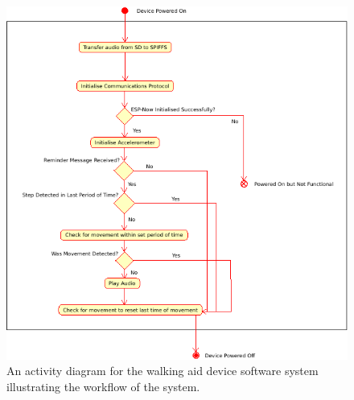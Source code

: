 \begin{figure}[H]
	\centering
	\captionsetup{width=1.0\linewidth}


	\includegraphics[width=1.0\linewidth]{./UML/WalkingAidDevice/activity diagram.png}

	\caption[Walking Aid Device Activity Diagram]{An activity diagram for the walking aid device software system illustrating the workflow of the system.}

	\label{fig:activity_diagram_walking_aid}

\end{figure}